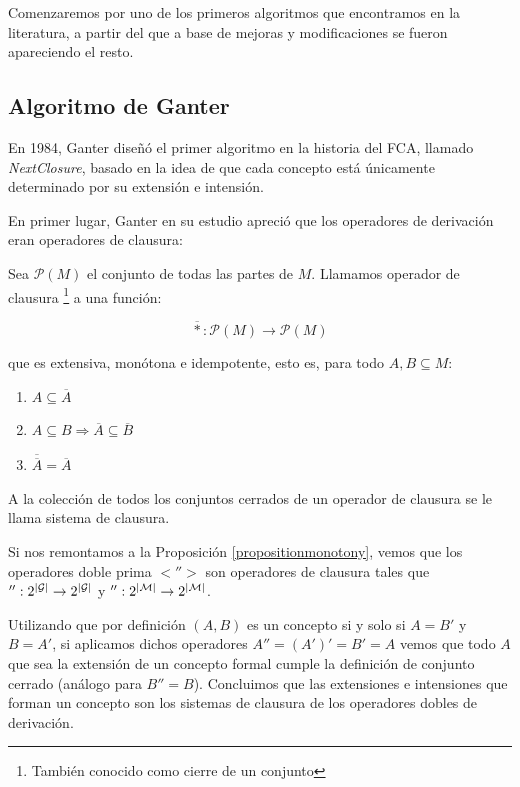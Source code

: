 \documentclass[oneside,openright,titlepage,numbers=noenddot,openany,headinclude,footinclude=true,
cleardoublepage=empty,abstractoff,BCOR=5mm,paper=a4,fontsize=12pt,main=spanish]{scrreprt}
\begin{document}
Comenzaremos por uno de los primeros algoritmos que encontramos en la literatura, a partir del que a base de mejoras y modificaciones se fueron apareciendo el resto.

\subsection{Algoritmo de Ganter}
\label{alg:nextclosue}

En 1984, Ganter \cite{Ganter} diseñó el primer algoritmo en la historia del FCA,  llamado \textit{NextClosure}, basado en la idea de que cada concepto está únicamente determinado por su extensión e intensión.

En primer lugar, Ganter en su estudio apreció que los operadores de derivación eran operadores de clausura:

\begin{definition}

Sea $\mathcal{P}(M)$ el conjunto de todas las partes de $M$. Llamamos operador de clausura \footnote{También conocido como cierre de un conjunto} a una función:

$$ \overline{*} : \mathcal{P}(M) \to \mathcal{P}(M) $$ 

que es extensiva, monótona e idempotente, esto es, para todo $A,B \subseteq M$:

\begin{enumerate}
    \item $A \subseteq \overline{A}$
    \item $A \subseteq B \Longrightarrow \overline{A} \subseteq \overline{B}$
    \item $\overline{\overline{A}} = \overline{A}$
\end{enumerate}
\end{definition}

\begin{definition}

A la colección de todos los conjuntos cerrados de un operador de clausura se le llama sistema de clausura.

\end{definition}

Si nos remontamos a la Proposición \ref{propositionmonotony}, vemos que los operadores doble prima $<''>$ son operadores de clausura tales que $'':2^{|\mathcal{G}|} \to 2^{|\mathcal{G}|}$ y $'':2^{|\mathcal{M}|}\to2^{|\mathcal{M}|}$. 

Utilizando que por definición $(A,B)$ es un concepto si y solo si $A=B'$ y $B=A'$, si aplicamos dichos operadores $A'' = (A')' = B ' = A$ vemos que todo $A$ que sea la extensión de un concepto formal cumple la definición de conjunto cerrado (análogo para $B''=B$). Concluimos que las extensiones e intensiones que forman un concepto son los sistemas de clausura de los operadores dobles de derivación.
\end{document}
